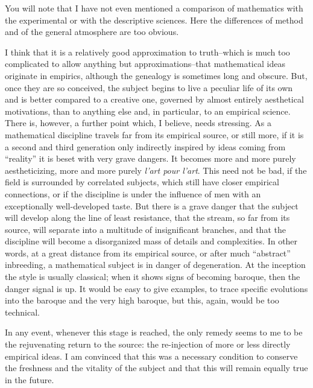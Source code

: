 \documentclass{article}
\begin{document}
You will note that I have not even mentioned a comparison of mathematics with the experimental or with the descriptive sciences. Here the differences of method and of the general atmosphere are too obvious.

I think that it is a relatively good approximation to truth--which is much too complicated to allow anything but approximations--that mathematical ideas originate in empirics, although the genealogy is sometimes long and obscure. But, once they are so conceived, the subject begins to live a peculiar life of its own and is better compared to a creative one, governed by almost entirely aesthetical motivations, than to anything else and, in particular, to an empirical science. There is, however, a further point which, I believe, needs stressing. As a mathematical discipline travels far from its empirical source, or still more, if it is a second and third generation only indirectly inspired by ideas coming from ``reality'' it is beset with very grave dangers. It becomes more and more purely aestheticizing, more and more purely \textit{l'art pour l'art}. This need not be bad, if the field is surrounded by correlated subjects, which still have closer empirical connections, or if the discipline is under the influence of men with an exceptionally well-developed taste. But there is a grave danger that the subject will develop along the line of least resistance, that the stream, so far from its source, will separate into a multitude of insignificant branches, and that the discipline will become a disorganized mass of details and complexities. In other words, at a great distance from its empirical source, or after much ``abstract'' inbreeding, a mathematical subject is in danger of degeneration. At the inception the style is usually classical; when it shows signs of becoming baroque, then the danger signal is up. It would be easy to give examples, to trace specific evolutions into the baroque and the very high baroque, but this, again, would be too technical.

In any event, whenever this stage is reached, the only remedy seems to me to be the rejuvenating return to the source: the re-injection of more or less directly empirical ideas. I am convinced that this was a necessary condition to conserve the freshness and the vitality of the subject and that this will remain equally true in the future.
\end{document}
